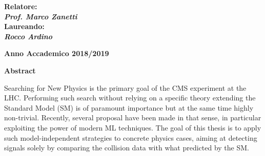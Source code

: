 \begin{titlepage}
\vspace{10mm}

\begin{spacing}{2}
\begin{flushleft}                           
{\Large \textbf{Relatore:}	\\
\textbf{\textit{Prof. Marco Zanetti}}} \\
{\Large \textbf{Laureando:}	\\
\textbf{\textit{Rocco Ardino}}} \\
\end{flushleft} 
\end{spacing}
\vspace{15 mm}

\begin{center}
{\Large{\bf Anno Accademico 2018/2019}}
\end{center}
\end{titlepage}






\begin{center}
{{\large{\bf Abstract}}}
\end{center}

\begin{center}
Searching for New Physics is the primary goal of the CMS experiment at the LHC. Performing such search without relying on a
specific theory extending the Standard Model (SM) is of paramount importance but at the same time highly non-trivial. Recently,
several proposal have been made in that sense, in particular exploiting the power of modern ML techniques. The goal of this thesis is
to apply such model-independent strategies to concrete physics cases, aiming at detecting signals solely by comparing the collision
data with what predicted by the SM.
\end{center}





\clearpage{\pagestyle{empty}\cleardoublepage}